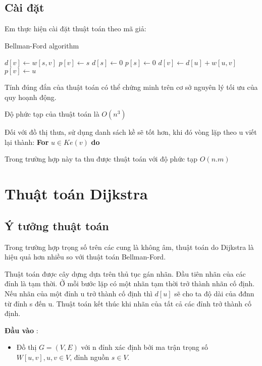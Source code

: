 \documentclass[../main-report.tex]{subfiles}
\begin{document}
\subsection{Cài đặt}
Em thực hiện cài đặt thuật toán theo mã giả:
\begin{algorithm}
\caption{Bellman-Ford algorithm}\label{Bellman-Ford}
\begin{algorithmic}[1]
              
    \State $d[v] \gets w[s, v]$
    \State $p[v] \gets s$
\EndFor
\State $d[s] \gets 0$
\State $p[s] \gets 0$           
                    
                \State $d[v] \gets d[u] + w[u, v]$
                \State $p[v] \gets u$
            \EndIf 
        \EndFor 
    \EndFor
\EndFor
\EndProcedure
\end{algorithmic}
\end{algorithm}

Tính đúng đắn của thuật toán có thể chứng minh trên cơ sở nguyên lý tối ưu của quy hoạnh động.

Độ phức tạp của thuật toán là $O(n^{3})$

Đối với đồ thị thưa, sử dụng danh sách kề sẽ tốt hơn, khi đó vòng lặp theo u viết lại thành:
\textbf{For} $u \in Ke(v)$ \textbf{do}

Trong trường hợp này ta thu được thuật toán với độ phức tạp $O(n.m)$

\section{Thuật toán Dijkstra}
\subsection{Ý tưởng thuật toán}
Trong trường hợp trọng số trên các cung là không âm, thuật toán do Dijkstra là hiệu quả hơn nhiều so với thuật toán Bellman-Ford.

Thuật toán được cây dựng dựa trên thủ tục gán nhãn. Đầu tiên nhãn của các đỉnh là tạm thời. Ở mỗi bước lặp có một nhãn tạm thời trở thành nhãn cố định. Nếu nhãn của một đỉnh u trở thành cố
định thì $d[u]$ sẽ cho ta độ dài của đđnn từ đỉnh s đến u. Thuật toán kết thúc khi nhãn của tất cả các đỉnh trở thành cố định.

\textbf{Đầu vào} : 
\begin{itemize}
\item Đồ thị $G = (V, E)$ với n đỉnh xác định bởi ma trận trọng số $W[u, v], u,v \in V$, đỉnh nguồn $s \in V$.
\end{itemize}
\end{document}
